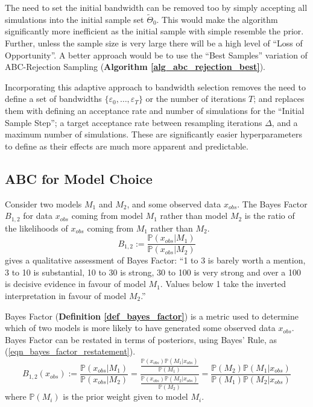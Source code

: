 \documentclass[11pt,a4paper]{article}
\newcommand*{\prob}{\mathbb{P}}
\theoremstyle{break}
\begin{document}
  \par The need to set the initial bandwidth can be removed too by simply accepting all simulations into the initial sample set $\tilde\Theta_0$. This would make the algorithm significantly more inefficient as the initial sample with simple resemble the prior. Further, unless the sample size is very large there will be a high level of ``Loss of Opportunity''. A better approach would be to use the ``Best Samples'' variation of ABC-Rejection Sampling (\textbf{Algorithm \ref{alg_abc_rejection_best}}).

  \par Incorporating this adaptive approach to bandwidth selection removes the need to define a set of bandwidths $\{\varepsilon_0,\dots,\varepsilon_T\}$ or the number of iterations $T$; and replaces them with defining an acceptance rate and number of simulations for the ``Initial Sample Step''; a target acceptance rate between resampling iterations $\Delta$, and a maximum number of simulations. These are significantly easier hyperparameters to define as their effects are much more apparent and predictable.

\subsection{ABC for Model Choice}\label{sec_abc_model_choice}

  \begin{box_definition}\label{def_bayes_factor}
    Consider two models $M_1$ and $M_2$, and some observed data $x_{obs}$. The Bayes Factor $B_{1,2}$ for data $x_{obs}$ coming from model $M_1$ rather than model $M_2$ is the ratio of the likelihoods of $x_{obs}$ coming from $M_1$ rather than $M_2$.
    \[ B_{1,2}:=\frac{\prob(x_{obs}|M_1)}{\prob(x_{obs}|M_2)} \]
    \cite[]{theory_of_probability} gives a qualitative assessment of Bayes Factor: ``1 to 3 is barely worth a mention, 3 to 10 is substantial, 10 to 30 is strong, 30 to 100 is very strong and over a 100 is decisive evidence in favour of model $M_1$. Values below 1 take the inverted interpretation in favour of model $M_2$.''
    \par
  \end{box_definition}

  Bayes Factor (\textbf{Definition \ref{def_bayes_factor}}) is a metric used to determine which of two models is more likely to have generated some observed data $x_{obs}$. Bayes Factor can be restated in terms of posteriors, using Bayes' Rule, as (\ref{eqn_bayes_factor_restatement}).
  \begin{equation}\label{eqn_bayes_factor_restatement}
    B_{1,2}(x_{obs}):=\frac{\prob(x_{obs}|M_1)}{\prob(x_{obs}|M_2)}=\frac{\frac{\prob(x_{obs})\prob(M_1|x_{obs})}{\prob(M_1)}}{\frac{\prob(x_{obs})\prob(M_2|x_{obs})}{\prob(M_2)}}=\frac{\prob(M_2)\prob(M_1|x_{obs})}{\prob(M_1)\prob(M_2|x_{obs})}
  \end{equation}
  where $\prob(M_i)$ is the prior weight given to model $M_i$.
\end{document}
